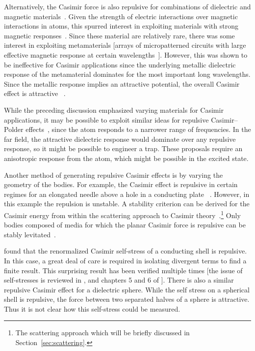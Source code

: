 Alternatively, the Casimir force is also repulsive for combinations of dielectric and magnetic materials~\citep{Boyer1974}.  
Given the strength of electric interactions over magnetic interactions in atoms, this spurred interest
in exploiting materials with strong magnetic responses~\citep{Kenneth2002}.  
Since these material are relatively rare, there was some interest in exploiting metamaterials [arrays of micropatterned circuits with
large effective magnetic response at certain wavelengths~\citep{Pendry1999}].  However, this was shown to be ineffective
for Casimir applications since the underlying metallic dielectric response of the metamaterial dominates for the most important long wavelengths.
Since the metallic response implies an attractive potential, the overall Casimir effect is attractive~
\citep{Ianuzzi2003comment,Rosa2008,Pirozhenko2008,Yannopapas2009}.  

While the preceding discussion emphasized varying materials for Casimir applications, it may 
be possible to exploit similar ideas for repulsive Casimir--Polder effects~\citep{Milton2011,Milton2012},
since the atom responds to a narrower range of frequencies.  In the far field, the attractive dielectric
response would dominate over any repulsive response, so it might be possible to engineer a trap.  
These proposals require an anisotropic response from the atom, which might be possible in the excited state.

Another method of generating repulsive Casimir effects is by varying the geometry of the bodies.  
For example, the Casimir effect is repulsive in certain regimes for an elongated needle above a hole in a conducting plate~
\citep{Levin2010,Rodriguez2013}.  However, in this example the repulsion is unstable. 
A stability criterion can be derived for the Casimir energy from within the scattering approach to 
Casimir theory~\citep{Rahi2010,Rahi2011}.\footnote{The scattering approach which will be briefly discussed in Section~\ref{sec:scattering}.}  
Only bodies composed of media for which the planar Casimir force is repulsive can be stably levitated~\citep{Rahi2011}.

\citet{Boyer1968} found that the renormalized Casimir self-stress of a conducting shell 
is repulsive.  In this case, a great deal of care is required in isolating 
divergent terms to find a finite result.
This surprising result has been verified multiple times [the issue of self-stresses
 is reviewed in \citet{Milton2011}, and chapters 5 and 6 of \citet{Milton2001}].
There is also a similar repulsive Casimir effect for a dielectric sphere.  
While the self stress on a spherical shell is repulsive, the force between two separated halves of a sphere is attractive.  
Thus it is not clear how this self-stress could be measured.  

